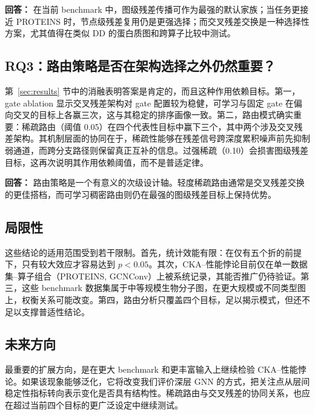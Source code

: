 \textbf{回答：} 在当前 benchmark 中，图级残差传播可作为最强的默认家族；当任务更接近 PROTEINS 时，节点级残差复用仍是更强选择；而交叉残差交换是一种选择性方案，尤其值得在类似 DD 的蛋白质图和跨算子比较中测试。

\subsection{RQ3：路由策略是否在架构选择之外仍然重要？}

第~\ref{sec:results} 节中的消融表明答案是肯定的，而且这种作用依赖目标。第一，gate ablation 显示交叉残差架构对 gate 配置较为稳健，可学习与固定 gate 在偏向交叉的目标上各赢三次，这与其稳定的排序画像一致。第二，路由模式确实重要：稀疏路由（阈值 0.05）在四个代表性目标中赢下三个，其中两个涉及交叉残差架构。其机制层面的协同在于，稀疏性能够在残差信号跨深度累积噪声前先抑制弱通道，而跨分支路径则保留真正互补的信息。过强稀疏（0.10）会损害图级残差目标，这再次说明其作用依赖阈值，而不是普适定律。

\textbf{回答：} 路由策略是一个有意义的次级设计轴。轻度稀疏路由通常是交叉残差交换的更佳搭档，而可学习稠密路由则仍在最强的图级残差目标上保持优势。

\subsection{局限性}

这些结论的适用范围受到若干限制。首先，统计效能有限：在仅有五个折的前提下，只有较大效应才容易达到 $p < 0.05$。其次，CKA--性能悖论目前仅在单一数据集--算子组合（PROTEINS, GCNConv）上被系统记录，其能否推广仍待验证。第三，这些 benchmark 数据集属于中等规模生物分子图，在更大规模或不同类型图上，权衡关系可能改变。第四，路由分析只覆盖四个目标，足以揭示模式，但还不足以支撑普适性结论。

\subsection{未来方向}

最重要的扩展方向，是在更大 benchmark 和更丰富输入上继续检验 CKA--性能悖论。如果该现象能够泛化，它将改变我们评价深层 GNN 的方式，把关注点从层间稳定性指标转向表示变化是否具有结构性。稀疏路由与交叉残差的协同关系，也应在超过当前四个目标的更广泛设定中继续测试。
